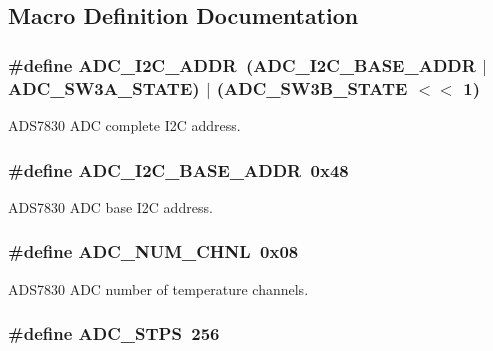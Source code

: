 \subsection{Macro Definition Documentation}
\hypertarget{a00058_a5fd3aabe18504a5314a5d0e71e3bc495}{
\subsubsection[{A\-D\-C\-\_\-\-I2\-C\-\_\-\-A\-D\-D\-R}]{\setlength{\rightskip}{0pt plus 5cm}\#define A\-D\-C\-\_\-\-I2\-C\-\_\-\-A\-D\-D\-R~({\bf A\-D\-C\-\_\-\-I2\-C\-\_\-\-B\-A\-S\-E\-\_\-\-A\-D\-D\-R} $|$ {\bf A\-D\-C\-\_\-\-S\-W3\-A\-\_\-\-S\-T\-A\-T\-E}) $|$ ({\bf A\-D\-C\-\_\-\-S\-W3\-B\-\_\-\-S\-T\-A\-T\-E} $<$$<$ 1)}}\label{a00058_a5fd3aabe18504a5314a5d0e71e3bc495}
A\-D\-S7830 A\-D\-C complete I2\-C address. \hypertarget{a00058_a6c0e4f915b6ac0c3af9a27d604f1f7b1}{
\subsubsection[{A\-D\-C\-\_\-\-I2\-C\-\_\-\-B\-A\-S\-E\-\_\-\-A\-D\-D\-R}]{\setlength{\rightskip}{0pt plus 5cm}\#define A\-D\-C\-\_\-\-I2\-C\-\_\-\-B\-A\-S\-E\-\_\-\-A\-D\-D\-R~0x48}}\label{a00058_a6c0e4f915b6ac0c3af9a27d604f1f7b1}
A\-D\-S7830 A\-D\-C base I2\-C address. \hypertarget{a00058_a448e8a52be570dfe9fdddb2045039534}{
\subsubsection[{A\-D\-C\-\_\-\-N\-U\-M\-\_\-\-C\-H\-N\-L}]{\setlength{\rightskip}{0pt plus 5cm}\#define A\-D\-C\-\_\-\-N\-U\-M\-\_\-\-C\-H\-N\-L~0x08}}\label{a00058_a448e8a52be570dfe9fdddb2045039534}
A\-D\-S7830 A\-D\-C number of temperature channels. \hypertarget{a00058_a9be6401f8c9339711816bec5ca55dd88}{
\subsubsection[{A\-D\-C\-\_\-\-S\-T\-P\-S}]{\setlength{\rightskip}{0pt plus 5cm}\#define A\-D\-C\-\_\-\-S\-T\-P\-S~256}}\label{a00058_a9be6401f8c9339711816bec5ca55dd88}
